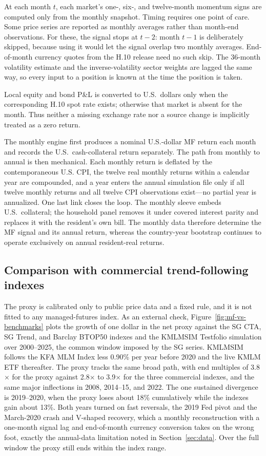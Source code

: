 \documentclass[11pt]{article}
\begin{document}
At each month $t$, each market's one-, six-, and twelve-month momentum signs
are computed only from the monthly snapshot. Timing requires one point of
care. Some price series are reported as monthly averages rather than
month-end observations. For these, the signal stops at $t-2$: month $t-1$ is
deliberately skipped, because using it would let the signal overlap two
monthly averages. End-of-month currency quotes from the H.10 release need no
such skip. The 36-month volatility estimate and the inverse-volatility sector
weights are lagged the same way, so every input to a position is known at the
time the position is taken.

Local equity and bond P\&L is converted to U.S.\ dollars only when the
corresponding H.10 spot rate exists; otherwise that market is absent for the
month. Thus neither a missing exchange rate nor a source change is implicitly
treated as a zero return.

The monthly engine first produces a nominal U.S.-dollar MF return each month
and records the U.S.\ cash-collateral return separately. The path from monthly
to annual is then mechanical. Each monthly return is deflated by the
contemporaneous U.S. CPI, the twelve real monthly returns within a calendar
year are compounded, and a year enters the annual simulation file only if all
twelve monthly returns and all twelve CPI observations exist---no partial year
is annualized. One last link closes the loop. The monthly sleeve embeds U.S.\
collateral; the household panel removes it under covered interest parity and
replaces it with the resident's own bill. The monthly data therefore determine
the MF signal and its annual return, whereas the country-year bootstrap
continues to operate exclusively on annual resident-real returns.

\subsection{Comparison with commercial trend-following indexes}
\label{app:mf-external}

The proxy is calibrated only to public price data and a fixed rule, and it is
not fitted to any managed-futures index. As an external check,
Figure~\ref{fig:mf-vs-benchmarks} plots the growth of one dollar in the net
proxy against the SG CTA, SG Trend, and Barclay BTOP50 indexes
\citep{SGIndices,BTOP50} and the KMLMSIM Testfolio simulation \citep{Testfol}
over 2000--2025, the common window imposed by the SG series. KMLMSIM follows
the KFA MLM Index less 0.90\% per year before 2020 and the live KMLM ETF
thereafter. The proxy tracks the same broad path, with end multiples of
3.8$\times$ for the proxy against 2.8$\times$ to 3.9$\times$ for the three
commercial indexes, and the same major inflections in 2008, 2014--15, and
2022. The one
sustained divergence is 2019--2020, when the proxy loses about 18\% cumulatively
while the indexes gain about 13\%. Both years turned on fast reversals, the 2019
Fed pivot and the March-2020 crash and V-shaped recovery, which a monthly
reconstruction with a one-month signal lag and end-of-month currency conversion
takes on the wrong foot, exactly the annual-data limitation noted in
Section~\ref{sec:data}. Over the full window the proxy still ends within the
index range.
\end{document}
